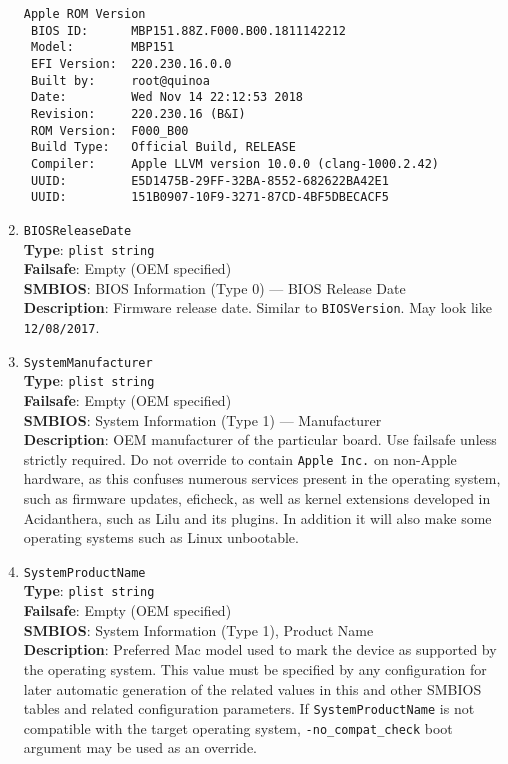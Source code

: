 \documentclass[]{article}
\begin{document}
\begin{enumerate}
\begin{verbatim}
Apple ROM Version
 BIOS ID:      MBP151.88Z.F000.B00.1811142212
 Model:        MBP151
 EFI Version:  220.230.16.0.0
 Built by:     root@quinoa
 Date:         Wed Nov 14 22:12:53 2018
 Revision:     220.230.16 (B&I)
 ROM Version:  F000_B00
 Build Type:   Official Build, RELEASE
 Compiler:     Apple LLVM version 10.0.0 (clang-1000.2.42)
 UUID:         E5D1475B-29FF-32BA-8552-682622BA42E1
 UUID:         151B0907-10F9-3271-87CD-4BF5DBECACF5
\end{verbatim}
\item
  \texttt{BIOSReleaseDate}\\
  \textbf{Type}: \texttt{plist\ string}\\
  \textbf{Failsafe}: Empty (OEM specified)\\
  \textbf{SMBIOS}: BIOS Information (Type 0) --- BIOS Release Date\\
  \textbf{Description}: Firmware release date. Similar to
  \texttt{BIOSVersion}. May look like \texttt{12/08/2017}.
\item
  \texttt{SystemManufacturer}\\
  \textbf{Type}: \texttt{plist\ string}\\
  \textbf{Failsafe}: Empty (OEM specified)\\
  \textbf{SMBIOS}: System Information (Type 1) --- Manufacturer\\
  \textbf{Description}: OEM manufacturer of the particular board. Use failsafe
  unless strictly required. Do not override to contain \texttt{Apple\ Inc.}
  on non-Apple hardware, as this confuses numerous services present in
  the operating system, such as firmware updates, eficheck, as well as
  kernel extensions developed in Acidanthera, such as Lilu and its
  plugins. In addition it will also make some operating systems
  such as Linux unbootable.
\item
  \texttt{SystemProductName}\\
  \textbf{Type}: \texttt{plist\ string}\\
  \textbf{Failsafe}: Empty (OEM specified)\\
  \textbf{SMBIOS}: System Information (Type 1), Product Name\\
  \textbf{Description}: Preferred Mac model used to mark the device as
  supported by the operating system. This value must be specified by any
  configuration for later automatic generation of the related values in
  this and other SMBIOS tables and related configuration parameters. If
  \texttt{SystemProductName} is not compatible with the target operating
  system, \texttt{-no\_compat\_check} boot argument may be used as an
  override.


\end{enumerate}
\end{document}
